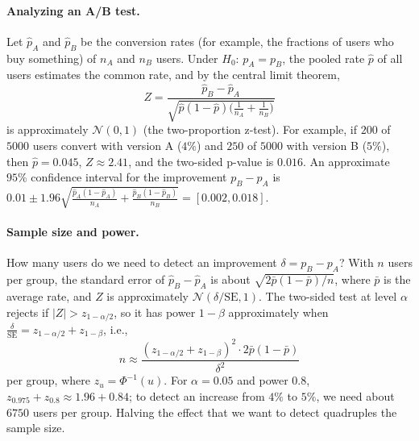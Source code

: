 \documentclass[11pt]{article}
\theoremstyle{definition}
\theoremstyle{plain}
\theoremstyle{remark}
\begin{document}
\paragraph{Analyzing an A/B test.} Let $\hat p_A$ and $\hat p_B$ be the conversion rates (for example, the fractions of users who buy something) of $n_A$ and $n_B$ users. Under $H_0$: $p_A = p_B$, the pooled rate $\hat p$ of all users estimates the common rate, and by the central limit theorem,
\[Z = \frac{\hat p_B - \hat p_A}{\sqrt{\hat p(1 - \hat p)\big(\frac{1}{n_A} + \frac{1}{n_B}\big)}}\]
is approximately $\mathcal{N}(0, 1)$ (the two-proportion z-test). For example, if $200$ of $5000$ users convert with version A ($4\%$) and $250$ of $5000$ with version B ($5\%$), then $\hat p = 0.045$, $Z \approx 2.41$, and the two-sided p-value is $0.016$. An approximate $95\%$ confidence interval for the improvement $p_B - p_A$ is $0.01 \pm 1.96\sqrt{\frac{\hat p_A(1 - \hat p_A)}{n_A} + \frac{\hat p_B(1 - \hat p_B)}{n_B}} = [0.002, 0.018]$.

\paragraph{Sample size and power.} How many users do we need to detect an improvement $\delta = p_B - p_A$? With $n$ users per group, the standard error of $\hat p_B - \hat p_A$ is about $\sqrt{2\bar p(1 - \bar p)/n}$, where $\bar p$ is the average rate, and $Z$ is approximately $\mathcal{N}(\delta/\mathrm{SE}, 1)$. The two-sided test at level $\alpha$ rejects if $|Z| > z_{1-\alpha/2}$, so it has power $1 - \beta$ approximately when $\frac{\delta}{\mathrm{SE}} = z_{1-\alpha/2} + z_{1-\beta}$, i.e.,
\[n \approx \frac{(z_{1-\alpha/2} + z_{1-\beta})^2 \cdot 2\bar p(1 - \bar p)}{\delta^2}\]
per group, where $z_u = \Phi^{-1}(u)$. For $\alpha = 0.05$ and power $0.8$, $z_{0.975} + z_{0.8} \approx 1.96 + 0.84$; to detect an increase from $4\%$ to $5\%$, we need about $6750$ users per group. Halving the effect that we want to detect quadruples the sample size.
\end{document}
